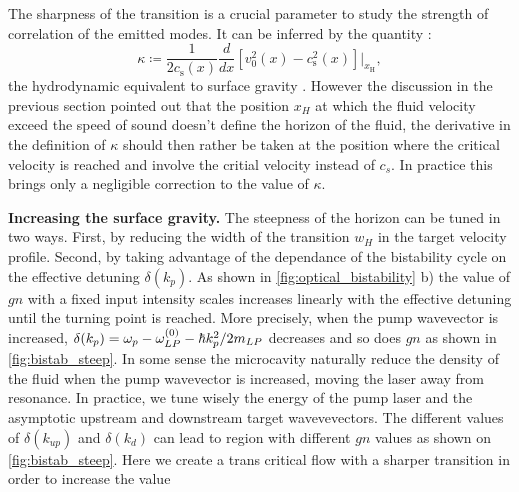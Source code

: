 The sharpness of the transition is a crucial parameter to study the strength of correlation of the emitted modes. It can be inferred by the quantity :
\begin{equation}
    \kappa \coloneqq \frac{1}{2c_\mathrm{s}(x)}\frac{d}{dx}[v^2_0(x)-c^2_\mathrm{s}(x)]|_{x_\mathrm{H}},
    \label{eq:steepness}
\end{equation}
the hydrodynamic equivalent to surface gravity \cite{barcelo_hawking-like_2006}. However the discussion in the previous section 
pointed out that the position $x_H$ at which the fluid velocity exceed the speed of sound doesn't define the horizon of the fluid, the derivative
in the definition of $\kappa$ should then rather be taken at the position where the critical velocity is reached and involve the critial velocity instead of $c_s$.
In practice this brings only a negligible correction to the value of $\kappa$. 

\bigskip

\textbf{Increasing the surface gravity.}
The steepness of the horizon can be tuned in two ways. First, by reducing the width of the transition $w_H$ in the target velocity profile.
Second, by taking advantage of the dependance of the bistability cycle on the effective detuning $\delta(k_p)$.
As shown in \autoref{fig:optical_bistability} b) the value of $gn$ with a fixed input intensity scales increases linearly with the effective detuning until the turning point is reached. More precisely,
when the pump wavevector is increased,  $\delta(k_p) = \omega_p-\omega_{LP}^{(0)}- \hbar k_p^2/2m_{LP}$ decreases and so does $gn$ as shown in \autoref{fig:bistab_steep}. In some
sense the microcavity naturally reduce the density of the fluid when the pump wavevector is increased, moving the laser away from resonance.
In practice, we tune wisely the energy of the pump laser and the asymptotic upstream and downstream target wavevevectors. The different values of $\delta(k_{up})$ and $\delta(k_{d})$ can
lead to region with different $gn$ values as shown on \autoref{fig:bistab_steep}.
Here we create a trans critical flow with a sharper transition in order to increase the value 

